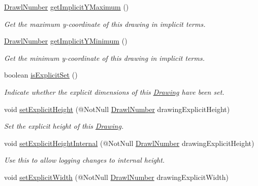 \begin{DoxyCompactItemize}
\hyperlink{classcom_1_1aarrelaakso_1_1drawl_1_1_drawl_number}{Drawl\+Number} \hyperlink{classcom_1_1aarrelaakso_1_1drawl_1_1_drawing_a98c65cfbe0cf261c4dfd516bfcf77328}{get\+Implicit\+Y\+Maximum} ()
\begin{DoxyCompactList}\small\item\em Get the maximum y-\/coordinate of this drawing in implicit terms. \end{DoxyCompactList}\item 
\hyperlink{classcom_1_1aarrelaakso_1_1drawl_1_1_drawl_number}{Drawl\+Number} \hyperlink{classcom_1_1aarrelaakso_1_1drawl_1_1_drawing_a0dcb410e8fb2769222b62d04da80eadd}{get\+Implicit\+Y\+Minimum} ()
\begin{DoxyCompactList}\small\item\em Get the minimum y-\/coordinate of this drawing in implicit terms. \end{DoxyCompactList}\item 
boolean \hyperlink{classcom_1_1aarrelaakso_1_1drawl_1_1_drawing_ab5e45e49b01dc01733156f2bd3e917ea}{is\+Explicit\+Set} ()
\begin{DoxyCompactList}\small\item\em Indicate whether the explicit dimensions of this \hyperlink{classcom_1_1aarrelaakso_1_1drawl_1_1_drawing}{Drawing} have been set. \end{DoxyCompactList}\item 
void \hyperlink{classcom_1_1aarrelaakso_1_1drawl_1_1_drawing_aac2e3632f849c85ff46669fac4098a7c}{set\+Explicit\+Height} (@Not\+Null \hyperlink{classcom_1_1aarrelaakso_1_1drawl_1_1_drawl_number}{Drawl\+Number} drawing\+Explicit\+Height)
\begin{DoxyCompactList}\small\item\em Set the explicit height of this \hyperlink{classcom_1_1aarrelaakso_1_1drawl_1_1_drawing}{Drawing}. \end{DoxyCompactList}\item 
void \hyperlink{classcom_1_1aarrelaakso_1_1drawl_1_1_drawing_a7f46180af4ae33964aba962625adff58}{set\+Explicit\+Height\+Internal} (@Not\+Null \hyperlink{classcom_1_1aarrelaakso_1_1drawl_1_1_drawl_number}{Drawl\+Number} drawing\+Explicit\+Height)
\begin{DoxyCompactList}\small\item\em Use this to allow logging changes to internal height. \end{DoxyCompactList}\item 
void \hyperlink{classcom_1_1aarrelaakso_1_1drawl_1_1_drawing_a6a7382cbb8f41b7b6b465f83f430d56a}{set\+Explicit\+Width} (@Not\+Null \hyperlink{classcom_1_1aarrelaakso_1_1drawl_1_1_drawl_number}{Drawl\+Number} drawing\+Explicit\+Width)

\end{DoxyCompactItemize}
